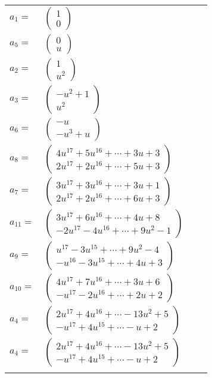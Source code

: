 \documentclass[1p]{elsarticle_modified}
\theoremstyle{definition}
\begin{document}
\begin{tabular}{m{7pt} m{180pt} m{7pt} m{180pt} }
\flushright $a_{1}=$&$\begin{pmatrix}1\\0\end{pmatrix}$ \\
\flushright $a_{5}=$&$\begin{pmatrix}0\\u\end{pmatrix}$ \\
\flushright $a_{2}=$&$\begin{pmatrix}1\\u^2\end{pmatrix}$ \\
\flushright $a_{3}=$&$\begin{pmatrix}- u^2+1\\u^2\end{pmatrix}$ \\
\flushright $a_{6}=$&$\begin{pmatrix}- u\\- u^3+u\end{pmatrix}$ \\
\flushright $a_{8}=$&$\begin{pmatrix}4 u^{17}+5 u^{16}+\cdots+3 u+3\\2 u^{17}+2 u^{16}+\cdots+5 u+3\end{pmatrix}$ \\
\flushright $a_{7}=$&$\begin{pmatrix}3 u^{17}+3 u^{16}+\cdots+3 u+1\\2 u^{17}+2 u^{16}+\cdots+6 u+3\end{pmatrix}$ \\
\flushright $a_{11}=$&$\begin{pmatrix}3 u^{17}+6 u^{16}+\cdots+4 u+8\\-2 u^{17}-4 u^{16}+\cdots+9 u^2-1\end{pmatrix}$ \\
\flushright $a_{9}=$&$\begin{pmatrix}u^{17}-3 u^{15}+\cdots+9 u^2-4\\- u^{16}-3 u^{15}+\cdots+4 u+3\end{pmatrix}$ \\
\flushright $a_{10}=$&$\begin{pmatrix}4 u^{17}+7 u^{16}+\cdots+3 u+6\\- u^{17}-2 u^{16}+\cdots+2 u+2\end{pmatrix}$ \\
\flushright $a_{4}=$&$\begin{pmatrix}2 u^{17}+4 u^{16}+\cdots-13 u^2+5\\- u^{17}+4 u^{15}+\cdots- u+2\end{pmatrix}$\\ \flushright $a_{4}=$&$\begin{pmatrix}2 u^{17}+4 u^{16}+\cdots-13 u^2+5\\- u^{17}+4 u^{15}+\cdots- u+2\end{pmatrix}$\\&\end{tabular}
\end{document}
